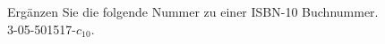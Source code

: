 \begin{aufgabe}[{Klausurvorbereitung 1}]
Ergänzen Sie die folgende Nummer zu einer ISBN-10 Buchnummer.\\
3-05-501517-$c_{10}$.
\end{aufgabe}
